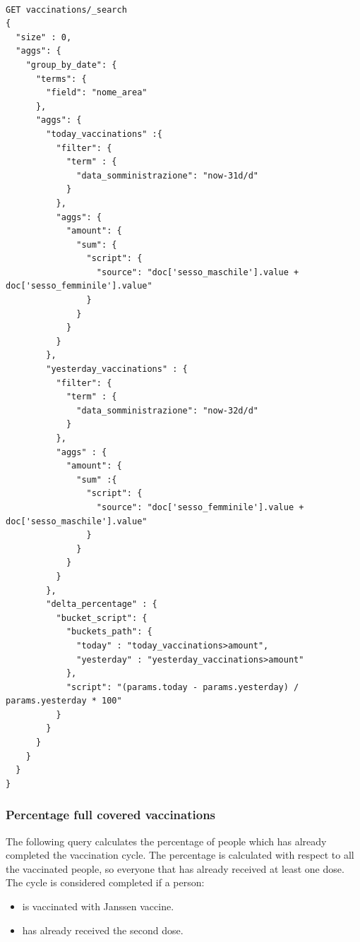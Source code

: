 \documentclass{article}
\begin{document}
\begin{lstlisting}[language=cypher, label=lst:cypher-example]

GET vaccinations/_search
{
  "size" : 0,
  "aggs": {
    "group_by_date": {
      "terms": {
        "field": "nome_area"
      },
      "aggs": {
        "today_vaccinations" :{
          "filter": {
            "term" : {
              "data_somministrazione": "now-31d/d"
            }
          },
          "aggs": {
            "amount": {
              "sum": {
                "script": {
                  "source": "doc['sesso_maschile'].value + doc['sesso_femminile'].value"
                }
              }
            }
          }
        },
        "yesterday_vaccinations" : {
          "filter": {
            "term" : {
              "data_somministrazione": "now-32d/d"
            }
          },
          "aggs" : {
            "amount": {
              "sum" :{
                "script": {
                  "source": "doc['sesso_femminile'].value + doc['sesso_maschile'].value"
                }
              }
            }
          }
        },
        "delta_percentage" : {
          "bucket_script": {
            "buckets_path": {
              "today" : "today_vaccinations>amount",
              "yesterday" : "yesterday_vaccinations>amount"
            },
            "script": "(params.today - params.yesterday) / params.yesterday * 100"
          }
        }
      }
    }
  }
}

\end{lstlisting}
\subsubsection{Percentage full covered vaccinations}
The following query calculates the percentage of people which has already completed the vaccination cycle. The percentage is calculated with respect to all the vaccinated people, so everyone that has already received at least one dose.
The cycle is considered completed if a person:
\begin{itemize}
\item is vaccinated with Janssen vaccine.
\item has already received the second dose.
\end{itemize}
\end{document}
